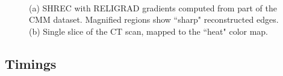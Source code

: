 \begin{figure}[htb]
	\centering
	\\
	\caption{(a) SHREC with RELIGRAD gradients computed from part of the CMM dataset. Magnified regions show ``sharp" reconstructed edges. (b) Single slice of the CT scan, mapped to the ``heat" color map.}\label{fig:ict:CMM}
\end{figure}


\subsection{Timings}

